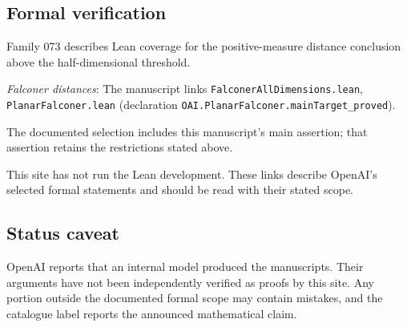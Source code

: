 \documentclass[11pt]{article}
\begin{document}
\subsection{Formal verification}
Family 073 describes Lean coverage for the positive-measure distance conclusion above the half-dimensional threshold.

\textit{Falconer distances}: The manuscript links \texttt{FalconerAllDimensions.lean}, \texttt{PlanarFalconer.lean} (declaration \texttt{OAI.PlanarFalconer.mainTarget\_proved}).

The documented selection includes this manuscript’s main assertion; that assertion retains the restrictions stated above.

This site has not run the Lean development. These links describe OpenAI’s selected formal statements and should be read with their stated scope.

\subsection{Status caveat}
OpenAI reports that an internal model produced the manuscripts. Their arguments have not been independently verified as proofs by this site. Any portion outside the documented formal scope may contain mistakes, and the catalogue label reports the announced mathematical claim.
\end{document}

